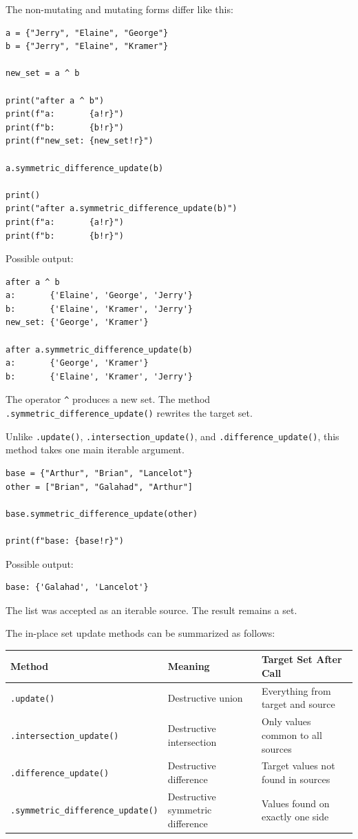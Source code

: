 The non-mutating and mutating forms differ like this:

\begin{verbatim}
a = {"Jerry", "Elaine", "George"}
b = {"Jerry", "Elaine", "Kramer"}

new_set = a ^ b

print("after a ^ b")
print(f"a:       {a!r}")
print(f"b:       {b!r}")
print(f"new_set: {new_set!r}")

a.symmetric_difference_update(b)

print()
print("after a.symmetric_difference_update(b)")
print(f"a:       {a!r}")
print(f"b:       {b!r}")
\end{verbatim}

Possible output:

\begin{verbatim}
after a ^ b
a:       {'Elaine', 'George', 'Jerry'}
b:       {'Elaine', 'Kramer', 'Jerry'}
new_set: {'George', 'Kramer'}

after a.symmetric_difference_update(b)
a:       {'George', 'Kramer'}
b:       {'Elaine', 'Kramer', 'Jerry'}
\end{verbatim}

The operator \texttt{\textasciicircum{}} produces a new set. The method \texttt{.symmetric\_difference\_update()} rewrites the target set.

Unlike \texttt{.update()}, \texttt{.intersection\_update()}, and \texttt{.difference\_update()}, this method takes one main iterable argument.

\begin{verbatim}
base = {"Arthur", "Brian", "Lancelot"}
other = ["Brian", "Galahad", "Arthur"]

base.symmetric_difference_update(other)

print(f"base: {base!r}")
\end{verbatim}

Possible output:

\begin{verbatim}
base: {'Galahad', 'Lancelot'}
\end{verbatim}

The list was accepted as an iterable source. The result remains a set.

The in-place set update methods can be summarized as follows:

\begin{center}
\begin{tabular}{lll}
\textbf{Method} & \textbf{Meaning} & \textbf{Target Set After Call} \\
\hline
\texttt{.update()} & Destructive union & Everything from target and source \\
\texttt{.intersection\_update()} & Destructive intersection & Only values common to all sources \\
\texttt{.difference\_update()} & Destructive difference & Target values not found in sources \\
\texttt{.symmetric\_difference\_update()} & Destructive symmetric difference & Values found on exactly one side \\
\end{tabular}
\end{center}

